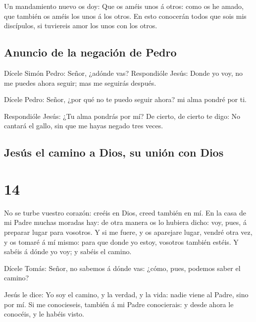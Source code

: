  Un mandamiento nuevo os doy: Que os améis unos á otros:
como os he amado, que también os améis los unos á los otros.
 En esto conocerán todos que sois mis discípulos, si
tuviereis amor los unos con los otros.

\hypertarget{anuncio-de-la-negaciuxf3n-de-pedro}{%
\subsection{Anuncio de la negación de
Pedro}\label{anuncio-de-la-negaciuxf3n-de-pedro}}

 Dícele Simón Pedro: Señor, ¿adónde vas? Respondióle
Jesús: Donde yo voy, no me puedes ahora seguir; mas me seguirás después.

 Dícele Pedro: Señor, ¿por qué no te puedo seguir ahora?
mi alma pondré por ti.

 Respondióle Jesús: ¿Tu alma pondrás por mí? De cierto,
de cierto te digo: No cantará el gallo, sin que me hayas negado tres
veces.

\hypertarget{jesuxfas-el-camino-a-dios-su-uniuxf3n-con-dios}{%
\subsection{Jesús el camino a Dios, su unión con
Dios}\label{jesuxfas-el-camino-a-dios-su-uniuxf3n-con-dios}}

\hypertarget{section-13}{%
\section{14}\label{section-13}}

 No se turbe vuestro corazón: creéis en Dios, creed
también en mí.  En la casa de mi Padre muchas moradas hay:
de otra manera os lo hubiera dicho: voy, pues, á preparar lugar para
vosotros.  Y si me fuere, y os aparejare lugar, vendré
otra vez, y os tomaré á mí mismo: para que donde yo estoy, vosotros
también estéis.  Y sabéis á dónde yo voy; y sabéis el
camino.

 Dícele Tomás: Señor, no sabemos á dónde vas: ¿cómo, pues,
podemos saber el camino?

 Jesús le dice: Yo soy el camino, y la verdad, y la vida:
nadie viene al Padre, sino por mí.  Si me conocieseis,
también á mi Padre conocierais: y desde ahora le conocéis, y le habéis
visto.


